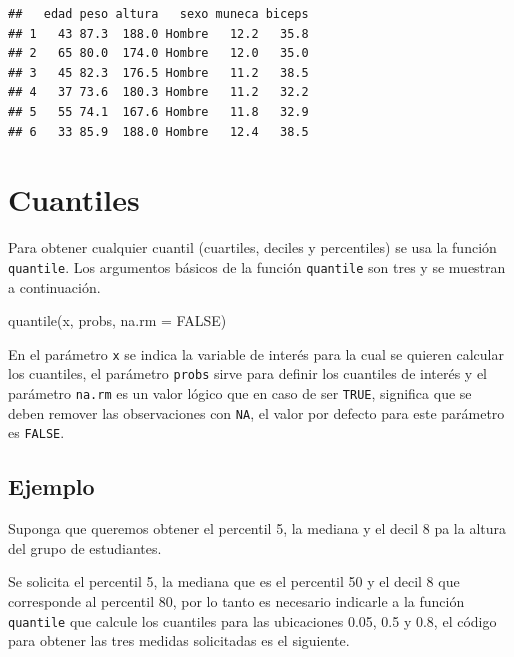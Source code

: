 \documentclass[
]{book}
\makeatletter
\newenvironment{Shaded}{\begin{snugshade}}{\end{snugshade}}
\newcommand{\AttributeTok}[1]{\textcolor[rgb]{0.77,0.63,0.00}{#1}}
\newcommand{\ConstantTok}[1]{\textcolor[rgb]{0.00,0.00,0.00}{#1}}
\newcommand{\FunctionTok}[1]{\textcolor[rgb]{0.00,0.00,0.00}{#1}}
\newcommand{\NormalTok}[1]{#1}
\newenvironment{kframe}{%
\medskip{}
\setlength{\fboxsep}{.8em}
 \def\at@end@of@kframe{}%
 \ifinner\ifhmode%
  \def\at@end@of@kframe{\end{minipage}}%
  \begin{minipage}{\columnwidth}%
 \fi\fi%
 \def\FrameCommand##1{\hskip\@totalleftmargin \hskip-\fboxsep
 \colorbox{shadecolor}{##1}\hskip-\fboxsep
     \hskip-\linewidth \hskip-\@totalleftmargin \hskip\columnwidth}%
 \MakeFramed {\advance\hsize-\width
   \@totalleftmargin\z@ \linewidth\hsize
   \@setminipage}}%
 {\par\unskip\endMakeFramed%
 \at@end@of@kframe}
\renewenvironment{Shaded}{\begin{kframe}}{\end{kframe}}
\makeatother
\begin{document}
\begin{verbatim}
##   edad peso altura   sexo muneca biceps
## 1   43 87.3  188.0 Hombre   12.2   35.8
## 2   65 80.0  174.0 Hombre   12.0   35.0
## 3   45 82.3  176.5 Hombre   11.2   38.5
## 4   37 73.6  180.3 Hombre   11.2   32.2
## 5   55 74.1  167.6 Hombre   11.8   32.9
## 6   33 85.9  188.0 Hombre   12.4   38.5
\end{verbatim}

\hypertarget{cuantiles}{%
\section{\texorpdfstring{Cuantiles     }{Cuantiles     }}\label{cuantiles}}

Para obtener cualquier cuantil (cuartiles, deciles y percentiles) se usa la función \texttt{quantile}. Los argumentos básicos de la función \texttt{quantile} son tres y se muestran a continuación.

\begin{Shaded}
\begin{Highlighting}[]
\FunctionTok{quantile}\NormalTok{(x, probs, }\AttributeTok{na.rm =} \ConstantTok{FALSE}\NormalTok{)}
\end{Highlighting}
\end{Shaded}

En el parámetro \texttt{x} se indica la variable de interés para la cual se quieren calcular los cuantiles, el parámetro \texttt{probs} sirve para definir los cuantiles de interés y el parámetro \texttt{na.rm} es un valor lógico que en caso de ser \texttt{TRUE}, significa que se deben remover las observaciones con \texttt{NA}, el valor por defecto para este parámetro es \texttt{FALSE}.

\hypertarget{ejemplo-42}{%
\subsection*{Ejemplo}\label{ejemplo-42}}

Suponga que queremos obtener el percentil 5, la mediana y el decil 8 pa la altura del grupo de estudiantes.

Se solicita el percentil 5, la mediana que es el percentil 50 y el decil 8 que corresponde al percentil 80, por lo tanto es necesario indicarle a la función \texttt{quantile} que calcule los cuantiles para las ubicaciones 0.05, 0.5 y 0.8, el código para obtener las tres medidas solicitadas es el siguiente.
\end{document}
